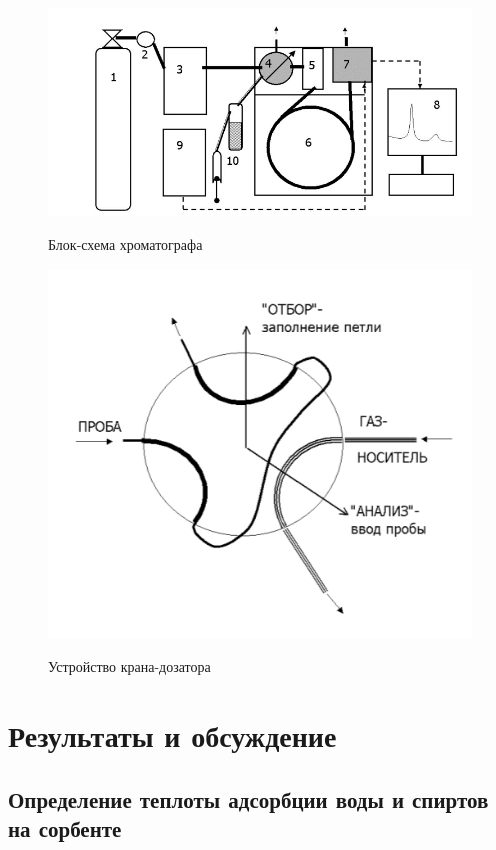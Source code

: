 \documentclass{article}
\begin{document}
\begin{figure}[!htb]
                 \includegraphics[width=\linewidth]{Images/схема хроматографа.png}
                 \label{fig:схема}
                 \caption{Блок-схема хроматографа}
                  \endminipage\hfill
                 \includegraphics[width=\linewidth]{Images/кран-дозатор.png}
                 \label{fig:кран}
                 \caption{Устройство крана-дозатора}
                  \endminipage
\end{figure}
\section{Результаты и обсуждение}
\subsection{Определение теплоты адсорбции воды и спиртов на сорбенте}\;
\end{document}
